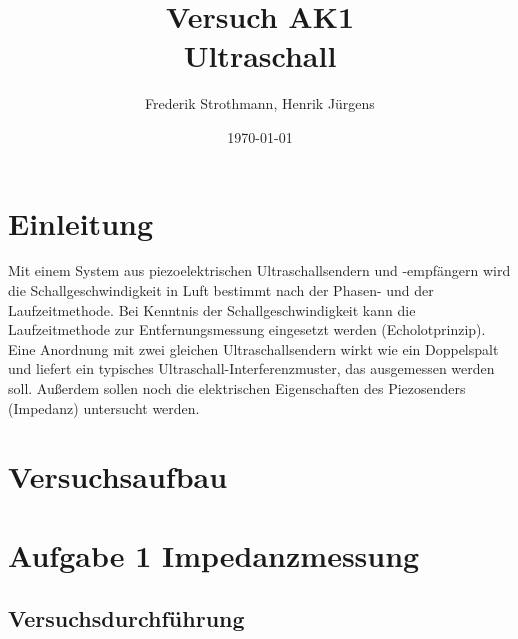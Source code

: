 \documentclass[12pt]{scrartcl}
\title{Versuch AK1\\ Ultraschall}
\author{Frederik Strothmann, Henrik Jürgens}
\date{\today}
\begin{document}

\maketitle
\newpage
\tableofcontents
\newpage


\section{Einleitung}
Mit einem System aus piezoelektrischen Ultraschallsendern und -empfängern wird die Schallgeschwindigkeit in Luft
bestimmt nach der Phasen- und der Laufzeitmethode. Bei Kenntnis der Schallgeschwindigkeit kann die Laufzeitmethode zur Entfernungsmessung eingesetzt werden (Echolotprinzip). Eine Anordnung mit zwei gleichen Ultraschallsendern wirkt wie ein Doppelspalt und liefert ein typisches
Ultraschall-Interferenzmuster, das ausgemessen werden soll.
Außerdem sollen noch die elektrischen Eigenschaften des Piezosenders (Impedanz) untersucht werden.


\section{Versuchsaufbau}

\section{Aufgabe 1 Impedanzmessung}
\subsection{Versuchsdurchführung}
\end{document}
